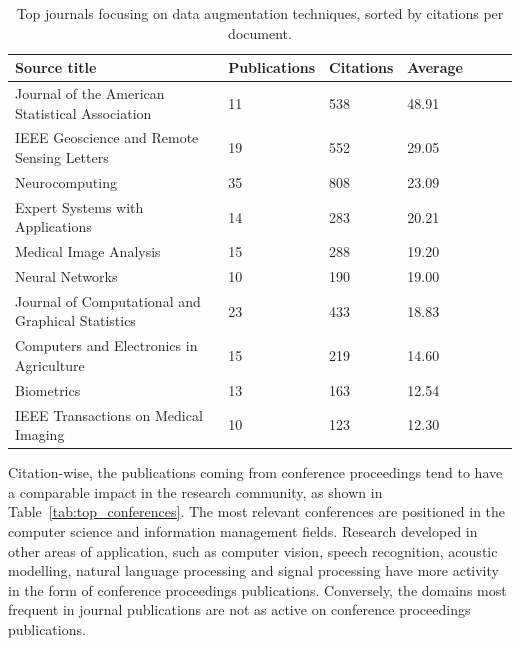 \documentclass[pdflatex,sn-mathphys]{sn-jnl}%
\theoremstyle{thmstyleone}
\theoremstyle{thmstyletwo}
\theoremstyle{thmstylethree}
\begin{document}
\begin{table}[ht]
    \begin{center}
    \caption{\label{tab:top_journals}
        Top journals focusing on data augmentation techniques, sorted by
        citations per document.
    }
    \begin{tabular*}{\textwidth}{@{\extracolsep{\fill}}lllllll@{\extracolsep{\fill}}}
        \toprule
        Source title & Publications & Citations & Average \\
        \midrule
        Journal of the American Statistical Association & 11 & 538 & 48.91 \\
        IEEE Geoscience and Remote Sensing Letters & 19 & 552 & 29.05 \\
        Neurocomputing & 35 & 808 & 23.09 \\
        Expert Systems with Applications & 14 & 283 & 20.21 \\
        Medical Image Analysis & 15 & 288 & 19.20 \\
        Neural Networks & 10 & 190 & 19.00 \\
        Journal of Computational and Graphical Statistics & 23 & 433 & 18.83 \\
        Computers and Electronics in Agriculture & 15 & 219 & 14.60 \\
        Biometrics & 13 & 163 & 12.54 \\
        IEEE Transactions on Medical Imaging & 10 & 123 & 12.30 \\
        \bottomrule
    \end{tabular*}
    \end{center}
\end{table}

Citation-wise, the publications coming from conference proceedings tend to
have a comparable impact in the research community, as shown in
Table~\ref{tab:top_conferences}. The most relevant conferences are positioned
in the computer science and information management fields. Research developed
in other areas of application, such as computer vision, speech recognition,
acoustic modelling, natural language processing and signal processing have
more activity in the form of conference proceedings publications. Conversely,
the domains most frequent in journal publications are not as active on
conference proceedings publications.
\end{document}
